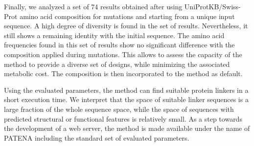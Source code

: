 Finally, we analyzed a set of 74 results obtained after using UniProtKB/Swiss-Prot amino acid composition for mutations and starting from a unique input sequence.
A high degree of diversity is found in the set of results. Nevertheless, it still shows a remaining identity with the initial sequence.
The amino acid frequencies found in this set of results show no significant difference with the composition applied during mutations. 
This allows to assess the capacity of the method to provide a diverse set of designs, while minimizing the associated metabolic cost.
The composition is then incorporated to the method as default.




Using the evaluated parameters, the method can find suitable protein linkers in a short execution time. 
We interpret that the space of suitable linker sequences is a large fraction of the whole sequence space, 
while the space of sequences with predicted structural or functional features is relatively small.
As a step towards the development of a web server, the method is made available under the name of PATENA including the standard set of evaluated parameters.
